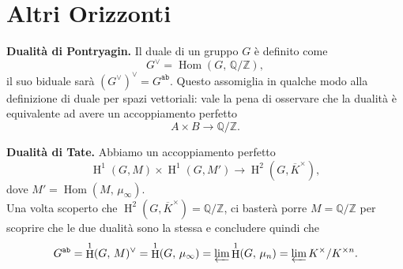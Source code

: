 \documentclass[a4paper]{article}
\theoremstyle{remark}
\theoremstyle{definition}
\newcommand{\Z}{\mathbb{Z}}
\newcommand{\Q}{\mathbb{Q}}
\DeclareMathOperator{\Hom}{Hom}
\DeclareMathOperator{\HH}{H}
\begin{document}
\section*{Altri Orizzonti}

\textbf{Dualità di Pontryagin.} Il duale di un gruppo $ G $ è definito come
\[ G^\vee = \Hom(G, \, \Q/\Z), \]
il suo biduale sarà $ (G^\vee)^\vee = G^{\texttt{ab}} $. Questo assomiglia in qualche modo alla definizione di duale per spazi vettoriali: vale la pena di osservare che la dualità è equivalente ad avere un accoppiamento perfetto
\[ A \times B \to \Q / \Z. \]

\textbf{Dualità di Tate.} Abbiamo un accoppiamento perfetto
\[ \HH^1(G, M) \times \HH^1(G, M') \to \HH^2(G, \overline{K}^\times), \]
dove $ M' = \Hom(M, \,\mu_\infty) $. \\

Una volta scoperto che $ \HH^2(G, \overline{K}^\times) = \Q / \Z $, ci basterà porre $ M = \Q/\Z $ per scoprire che le due dualità sono la stessa e concludere quindi che 
\[ G^\texttt{ab} = \HH^1(G, \, M)^\vee = \HH^1(G, \, \mu_\infty) = \varprojlim \HH^1(G, \, \mu_n ) = \varprojlim K^\times / K^{\times n}. \]
\end{document}
